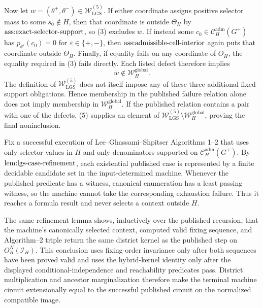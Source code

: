 Now let \(w=(\theta^+,\theta^-)\in\mathcal W_{\mathrm{LGS}}^{(5)}\).  If either coordinate assigns positive selector mass to some \(s_0\notin H\), then that coordinate is outside \(\Theta_H\) by \(\textnormal{ass:exact-selector-support}\), so (3) excludes \(w\).  If instead some \(c_0\in\mathcal C_H^{\mathrm{adm}}(G^+)\) has \(p_{\theta^\varepsilon}(c_0)=0\) for \(\varepsilon\in\{+,-\}\), then \(\textnormal{ass:admissible-cell-interior}\) again puts that coordinate outside \(\Theta_H\).  Finally, if equality fails on any coordinate of \(O_H\), the equality required in (3) fails directly.  Each listed defect therefore implies
\[
 w\notin\mathcal W_H^{\mathrm{global}}.
\tag{5}
\]
The definition of \(\mathcal W_{\mathrm{LGS}}^{(5)}\) does not itself impose any of these three additional fixed-support obligations.  Hence membership in the published failure relation alone does not imply membership in \(\mathcal W_H^{\mathrm{global}}\).  If the published relation contains a pair with one of the defects, (5) supplies an element of
\(\mathcal W_{\mathrm{LGS}}^{(5)}\setminus\mathcal W_H^{\mathrm{global}}\), proving the final noninclusion.

Fix a successful execution of Lee--Ghassami--Shpitser Algorithms 1--2 that uses only selector values in \(H\) and only denominators supported on \(\mathcal C_H^{\mathrm{adm}}(G^+)\).  By \(\textnormal{lem:lgs-case-refinement}\), each existential published case is represented by a finite decidable candidate set in the input-determined machine.  Whenever the published predicate has a witness, canonical enumeration has a least passing witness, so the machine cannot take the corresponding exhaustion failure.  Thus it reaches a formula result and never selects a context outside \(H\).

The same refinement lemma shows, inductively over the published recursion, that the machine's canonically selected context, computed valid fixing sequence, and Algorithm--2 triple return the same district kernel as the published step on \(O_H^N(\mathcal I_H)\).  This conclusion uses fixing-order invariance only after both sequences have been proved valid and uses the hybrid-kernel identity only after the displayed conditional-independence and reachability predicates pass.  District multiplication and ancestor marginalization therefore make the terminal machine circuit extensionally equal to the successful published circuit on the normalized compatible image.

